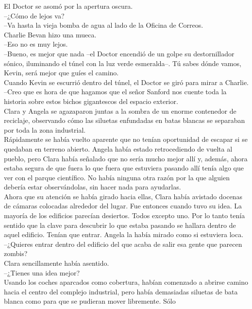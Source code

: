 El Doctor se asomó por la apertura oscura.\\
--¿Cómo de lejos va?\\
--Va hasta la vieja bomba de agua al lado de la Oficina de Correos.\\
Charlie Bevan hizo una mueca.\\
--Eso no es muy lejos.\\
--Bueno, es mejor que nada --el Doctor encendió de un golpe su
destornillador sónico, iluminando el túnel con la luz verde esmeralda--.
Tú sabes dónde vamos, Kevin, será mejor que guíes el camino.\\
Cuando Kevin se escurrió dentro del túnel, el Doctor se giró para mirar
a Charlie.\\
--Creo que es hora de que hagamos que el señor Sanford nos cuente toda
la historia sobre estos bichos gigantescos del espacio
exterior.\\[2\baselineskip]Clara y Angela se agazaparon juntas a la
sombra de un enorme contenedor de reciclaje, observando cómo las
siluetas enfundadas en batas blancas se separaban por toda la zona
industrial.\\
Rápidamente se había vuelto aparente que no tenían oportunidad de
escapar si se quedaban en terreno abierto. Angela había estado
retrocediendo de vuelta al pueblo, pero Clara había señalado que no
sería mucho mejor allí y, además, ahora estaba segura de que fuera lo
que fuera que estuviera pasando allí tenía algo que ver con el parque
científico. No había ninguna otra razón por la que alguien debería estar
observándolas, sin hacer nada para ayudarlas.\\
Ahora que su atención se había girado hacia ellas, Clara había avistado
docenas de cámaras colocadas alrededor del lugar. Fue entonces cuando
tuvo su idea. La mayoría de los edificios parecían desiertos. Todos
excepto uno. Por lo tanto tenía sentido que la clave para descubrir lo
que estaba pasando se hallara dentro de aquel edificio. Tenían que
entrar. Angela la había mirado como si estuviera loca.\\
--¿Quieres entrar dentro del edificio del que acaba de salir esa gente
que parecen zombis?\\
Clara sencillamente había asentido.\\
--¿Tienes una idea mejor?\\
Usando los coches aparcados como cobertura, habían comenzado a abrirse
camino hacia el centro del complejo industrial, pero había demasiadas
siluetas de bata blanca como para que se pudieran mover libremente. Sólo
